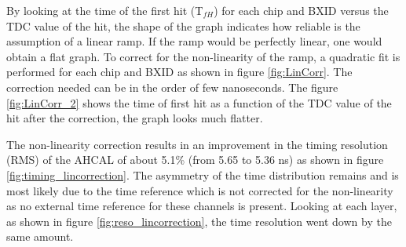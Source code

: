 By looking at the time of the first hit (T$_{fH}$) for each chip and BXID versus the TDC value of the hit, the shape of the graph indicates how reliable is the assumption of a linear ramp. If the ramp would be perfectly linear, one would obtain a flat graph. To correct for the non-linearity of the ramp, a quadratic fit is performed for each chip and BXID as shown in figure \ref{fig:LinCorr}. The correction needed can be in the order of few nanoseconds. The figure \ref{fig:LinCorr_2} shows the time of first hit as a function of the TDC value of the hit after the correction, the graph looks much flatter.

The non-linearity correction results in an improvement in the timing resolution (RMS) of the AHCAL of about 5.1\% (from 5.65 to 5.36 ns) as shown in figure \ref{fig:timing_lincorrection}. The asymmetry of the time distribution remains and is most likely due to the time reference which is not corrected for the non-linearity as no external time reference for these channels is present. Looking at each layer, as shown in figure \ref{fig:reso_lincorrection}, the time resolution went down by the same amount.

